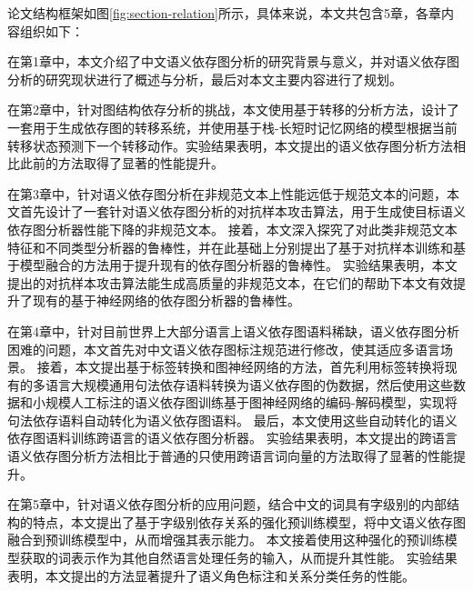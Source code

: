 论文结构框架如图\ref{fig:section-relation}所示，具体来说，本文共包含5章，各章内容组织如下：

在第1章中，本文介绍了中文语义依存图分析的研究背景与意义，并对语义依存图分析的研究现状进行了概述与分析，最后对本文主要内容进行了规划。

在第2章中，针对图结构依存分析的挑战，本文使用基于转移的分析方法，设计了一套用于生成依存图的转移系统，并使用基于栈-长短时记忆网络的模型根据当前转移状态预测下一个转移动作。实验结果表明，本文提出的语义依存图分析方法相比此前的方法取得了显著的性能提升。

在第3章中，针对语义依存图分析在非规范文本上性能远低于规范文本的问题，本文首先设计了一套针对语义依存图分析的对抗样本攻击算法，用于生成使目标语义依存图分析器性能下降的非规范文本。
接着，本文深入探究了对此类非规范文本特征和不同类型分析器的鲁棒性，并在此基础上分别提出了基于对抗样本训练和基于模型融合的方法用于提升现有的依存图分析器的鲁棒性。
实验结果表明，本文提出的对抗样本攻击算法能生成高质量的非规范文本，在它们的帮助下本文有效提升了现有的基于神经网络的依存图分析器的鲁棒性。

在第4章中，针对目前世界上大部分语言上语义依存图语料稀缺，语义依存图分析困难的问题，本文首先对中文语义依存图标注规范进行修改，使其适应多语言场景。
接着，本文提出基于标签转换和图神经网络的方法，首先利用标签转换将现有的多语言大规模通用句法依存语料转换为语义依存图的伪数据，然后使用这些数据和小规模人工标注的语义依存图训练基于图神经网络的编码-解码模型，实现将句法依存语料自动转化为语义依存图语料。
最后，本文使用这些自动转化的语义依存图语料训练跨语言的语义依存图分析器。
实验结果表明，本文提出的跨语言语义依存图分析方法相比于普通的只使用跨语言词向量的方法取得了显著的性能提升。

在第5章中，针对语义依存图分析的应用问题，结合中文的词具有字级别的内部结构的特点，本文提出了基于字级别依存关系的强化预训练模型，将中文语义依存图融合到预训练模型中，从而增强其表示能力。
本文接着使用这种强化的预训练模型获取的词表示作为其他自然语言处理任务的输入，从而提升其性能。
实验结果表明，本文提出的方法显著提升了语义角色标注和关系分类任务的性能。

